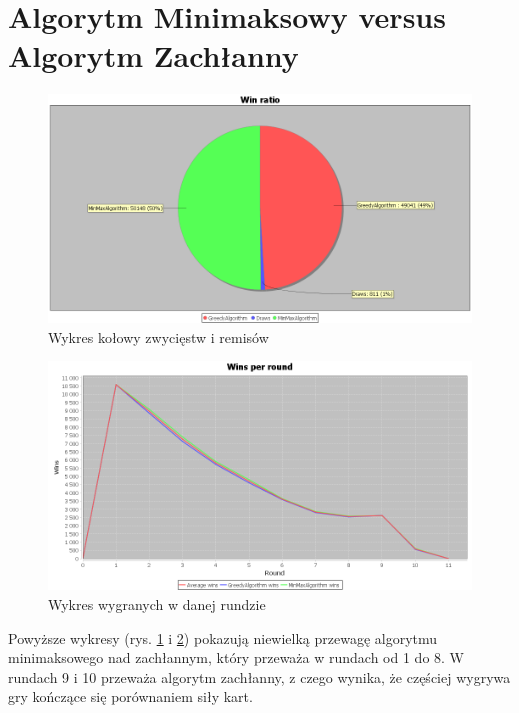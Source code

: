 \section{Algorytm Minimaksowy versus Algorytm Zachłanny}
\begin{figure}[H]
	\centering
	\includegraphics[width=\textwidth]{Resources/MirrorMmVsG/GVsMmWin.PNG}
	\caption{Wykres kołowy zwycięstw i remisów} 
	\label{fig:MirrorGVsMmWin}
\end{figure}

\begin{figure}[H]
	\centering
	\includegraphics[width=\textwidth]{Resources/MirrorMmVsG/GVsMmRoundWin.PNG}
	\caption{Wykres wygranych w danej rundzie} 
	\label{fig:MirrorGVsMmRoundWin}
\end{figure}

Powyższe wykresy (rys. \ref{fig:MirrorGVsMmWin} i \ref{fig:MirrorGVsMmRoundWin}) pokazują niewielką przewagę algorytmu minimaksowego nad zachłannym, który przeważa w rundach od 1 do 8. W rundach 9 i 10 przeważa algorytm zachłanny, z czego wynika, że częściej wygrywa gry kończące się porównaniem siły kart.

